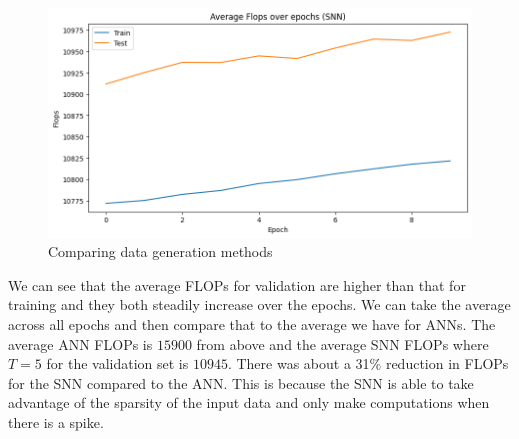 \documentclass[12pt, letterpaper]{article}
\begin{document}
\begin{figure}[H]
    \centering
    \includegraphics[width=1\textwidth]{flops_snn.png}
    \caption{Comparing data generation methods}
    \label{fig:flops_snn}
\end{figure}

We can see that the average FLOPs for validation are higher than that for training and they both steadily increase over the epochs. We can take the average across all epochs and then compare that to the average we have for ANNs. The average ANN FLOPs is $15900$ from above and the average SNN FLOPs where $T = 5$ for the validation set is $10945$. There was about a 31\% reduction in FLOPs for the SNN compared to the ANN. This is because the SNN is able to take advantage of the sparsity of the input data and only make computations when there is a spike.
\end{document}
